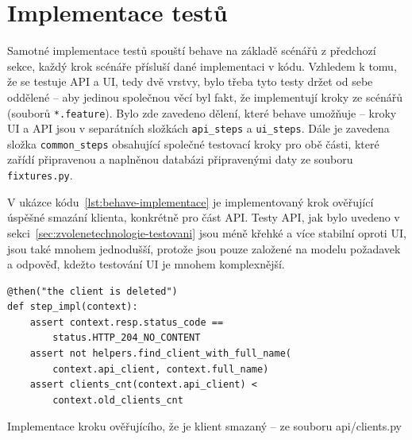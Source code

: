 \section{Implementace testů}\label{sec:implementacetestu}

Samotné implementace testů spouští behave na základě scénářů z předchozí sekce, každý krok scénáře přísluší dané implementaci v kódu. Vzhledem k tomu, že se testuje API a UI, tedy dvě vrstvy, bylo třeba tyto testy držet od sebe oddělené -- aby jedinou společnou věcí byl fakt, že implementují kroky ze scénářů (souborů \verb|*.feature|). Bylo zde zavedeno dělení, které behave umožňuje -- kroky UI a API jsou v separátních složkách \verb|api_steps| a \verb|ui_steps|. Dále je zavedena složka \verb|common_steps| obsahující společné testovací kroky pro obě části, které zařídí připravenou a naplněnou databázi připravenými daty ze souboru \verb|fixtures.py|.

V ukázce kódu~\ref{lst:behave-implementace} je implementovaný krok ověřující úspěšné smazání klienta, konkrétně pro část API. Testy API, jak bylo uvedeno v sekci~\ref{sec:zvolenetechnologie-testovani} jsou méně křehké a více stabilní oproti UI, jsou také mnohem jednodušší, protože jsou pouze založené na modelu požadavek a odpověď, kdežto testování UI je mnohem komplexnější.

\begin{listing}[ht]
	\begin{verbatim}
@then("the client is deleted")
def step_impl(context):
    assert context.resp.status_code == 
        status.HTTP_204_NO_CONTENT
    assert not helpers.find_client_with_full_name(
        context.api_client, context.full_name)
    assert clients_cnt(context.api_client) < 
        context.old_clients_cnt
	\end{verbatim}
	\caption{Implementace kroku ověřujícího, že je klient smazaný -- ze souboru api/clients.py}\label{lst:behave-implementace}
\end{listing}

